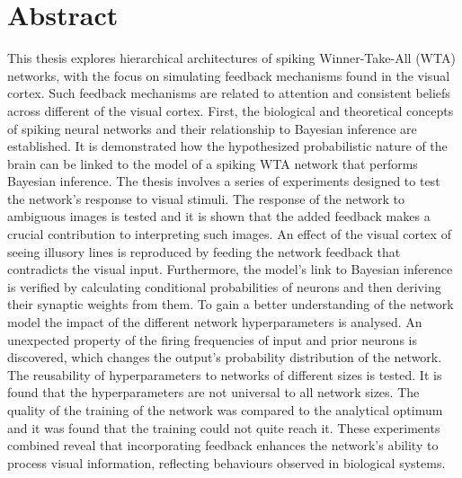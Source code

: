 
\chapter*{Abstract}
\label{cha:abstract}

This thesis explores hierarchical architectures of spiking Winner-Take-All (WTA) networks, with the focus on simulating feedback mechanisms found in the visual cortex. Such feedback mechanisms are related to attention and consistent beliefs across different of the visual cortex. 
First, the biological and theoretical concepts of spiking neural networks and their relationship to Bayesian inference are established. It is demonstrated how the hypothesized probabilistic nature of the brain can be linked to the model of a spiking WTA network that performs Bayesian inference.
The thesis involves a series of experiments designed to test the network's response to visual stimuli. The response of the network to ambiguous images is tested and it is shown that the added feedback makes a crucial contribution to interpreting such images. An effect of the visual cortex of seeing illusory lines is reproduced by feeding the network feedback that contradicts the visual input. Furthermore, the model's link to Bayesian inference is verified by calculating conditional probabilities of neurons and then deriving their synaptic weights from them. To gain a better understanding of the network model the impact of the different network hyperparameters is analysed. An unexpected property of the firing frequencies of input and prior neurons is discovered, which changes the output's probability distribution of the network. The reusability of hyperparameters to networks of different sizes is tested. It is found that the hyperparameters are not universal to all network sizes. The quality of the training of the network was compared to the analytical optimum and it was found that the training could not quite reach it. These experiments combined reveal that incorporating feedback enhances the network's ability to process visual information, reflecting behaviours observed in biological systems.

